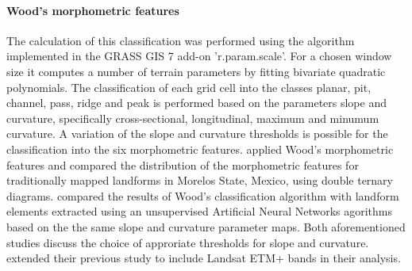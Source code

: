 \documentclass[preprint,12pt,authoryear]{elsarticle}
\begin{document}
\paragraph{Wood's morphometric features \citep{Wood1996}}
The calculation of this classification was performed using the algorithm implemented in the GRASS GIS 7  add-on 'r.param.scale'.  For a chosen window size it computes a number of terrain parameters by fitting bivariate quadratic polynomials.  The classification of each grid cell into the classes planar, pit, channel, pass, ridge and peak is performed based on the parameters slope and curvature, specifically cross-sectional, longitudinal, maximum and minumum curvature. A variation of  the slope and curvature thresholds is possible for the classification into the six morphometric features.
\cite{Bolongaro-Crevenna2005} applied Wood's morphometric features and compared the distribution of the morphometric features for traditionally mapped landforms in Morelos State, Mexico, using double ternary diagrams. \cite{Ehsani2008} compared the results of Wood's classification algorithm with landform elements extracted using  an unsupervised Artificial Neural Networks agorithms based on the the same slope and curvature parameter maps. Both aforementioned studies discuss the choice of approriate thresholds for slope and curvature. \cite{Ehsani2009} extended their previous study  to include Landsat ETM+ bands in their analysis.  
\end{document}
